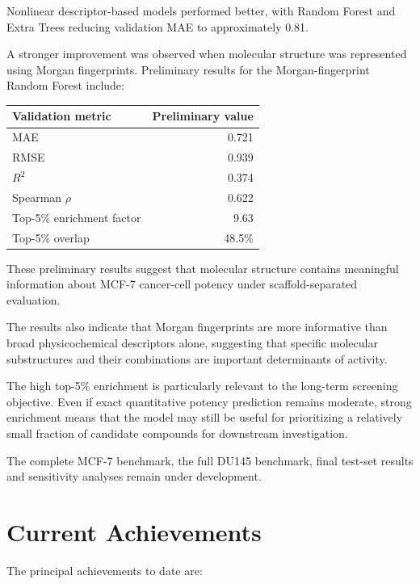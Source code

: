 \documentclass[11pt,a4paper]{article}
\begin{document}
Nonlinear descriptor-based models performed better, with Random Forest and Extra Trees reducing validation MAE to approximately 0.81.

A stronger improvement was observed when molecular structure was represented using Morgan fingerprints. Preliminary results for the Morgan-fingerprint Random Forest include:

\begin{center}
\begin{tabular}{lr}
\toprule
\textbf{Validation metric} & \textbf{Preliminary value} \\
\midrule
MAE & 0.721 \\
RMSE & 0.939 \\
$R^2$ & 0.374 \\
Spearman $\rho$ & 0.622 \\
Top-5\% enrichment factor & 9.63 \\
Top-5\% overlap & 48.5\% \\
\bottomrule
\end{tabular}
\end{center}

These preliminary results suggest that molecular structure contains meaningful information about MCF-7 cancer-cell potency under scaffold-separated evaluation.

The results also indicate that Morgan fingerprints are more informative than broad physicochemical descriptors alone, suggesting that specific molecular substructures and their combinations are important determinants of activity.

The high top-5\% enrichment is particularly relevant to the long-term screening objective. Even if exact quantitative potency prediction remains moderate, strong enrichment means that the model may still be useful for prioritizing a relatively small fraction of candidate compounds for downstream investigation.

The complete MCF-7 benchmark, the full DU145 benchmark, final test-set results and sensitivity analyses remain under development.

\section{Current Achievements}

The principal achievements to date are:
\end{document}
